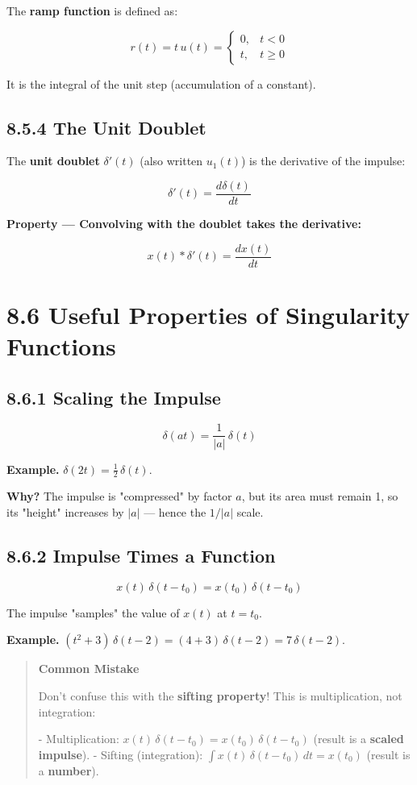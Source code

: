 \documentclass[11pt]{article}
\begin{document}
The \textbf{ramp function} is defined as:

\[r(t) = t\,u(t) = \begin{cases} 0, & t < 0 \\ t, & t \geq 0 \end{cases}\]

It is the integral of the unit step (accumulation of a constant).

\subsection*{8.5.4 The Unit Doublet}

The \textbf{unit doublet} $\delta'(t)$ (also written $u_1(t)$) is the derivative of the impulse:

\[\delta'(t) = \frac{d\delta(t)}{dt}\]

\textbf{Property — Convolving with the doublet takes the derivative:}

\[x(t)*\delta'(t) = \frac{d x(t)}{d t}\]

\section*{8.6 Useful Properties of Singularity Functions}

\subsection*{8.6.1 Scaling the Impulse}

\[\boxed{\;\delta(at) = \frac{1}{|a|}\,\delta(t)\;}\]

\textbf{Example.} $\delta(2t) = \tfrac{1}{2}\,\delta(t)$.

\textbf{Why?} The impulse is "compressed" by factor $a$, but its area must remain 1, so its "height" increases by $|a|$ — hence the $1/|a|$ scale.

\subsection*{8.6.2 Impulse Times a Function}

\[\boxed{\;x(t)\,\delta(t - t_0) = x(t_0)\,\delta(t - t_0)\;}\]

The impulse "samples" the value of $x(t)$ at $t = t_0$.

\textbf{Example.} $(t^2 + 3)\,\delta(t - 2) = (4 + 3)\,\delta(t - 2) = 7\,\delta(t - 2)$.

\begin{quote}
\textbf{Common Mistake}

Don't confuse this with the \textbf{sifting property}! This is multiplication, not integration:

- Multiplication: $x(t)\,\delta(t-t_0) = x(t_0)\,\delta(t-t_0)$ (result is a \textbf{scaled impulse}).
- Sifting (integration): $\int x(t)\,\delta(t-t_0)\,dt = x(t_0)$ (result is a \textbf{number}).
\end{quote}
\end{document}
